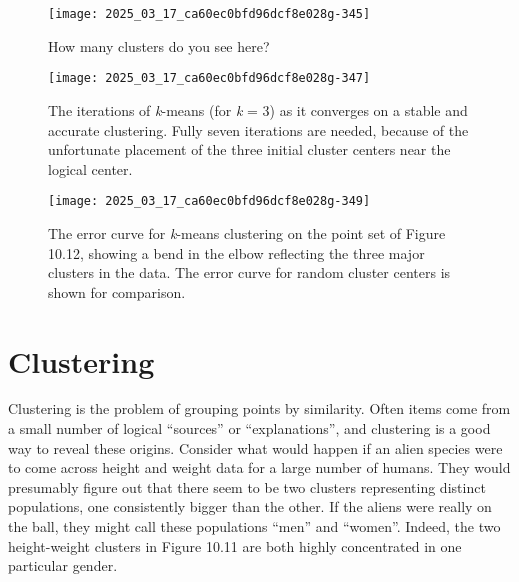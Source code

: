 \documentclass[10pt]{article}
\begin{document}
\begin{figure}[h]
\centering
\texttt{[image: 2025\_03\_17\_ca60ec0bfd96dcf8e028g-345]}
\caption{How many clusters do you see here?}
\end{figure}

\begin{figure}[h]
\centering
\texttt{[image: 2025\_03\_17\_ca60ec0bfd96dcf8e028g-347]}
\caption{The iterations of \textit{k}-means (for \textit{k} = 3) as it converges on a stable and accurate clustering. Fully seven iterations are needed, because of the unfortunate placement of the three initial cluster centers near the logical center.}
\end{figure}

\begin{figure}[h]
\centering
\texttt{[image: 2025\_03\_17\_ca60ec0bfd96dcf8e028g-349]}
\caption{The error curve for \textit{k}-means clustering on the point set of Figure 10.12, showing a bend in the elbow reflecting the three major clusters in the data. The error curve for random cluster centers is shown for comparison.}
\end{figure}

\section{Clustering}
Clustering is the problem of grouping points by similarity. Often items come from a small number of logical “sources” or “explanations”, and clustering is a good way to reveal these origins. Consider what would happen if an alien species were to come across height and weight data for a large number of humans. They would presumably figure out that there seem to be two clusters representing distinct populations, one consistently bigger than the other. If the aliens were really on the ball, they might call these populations “men” and “women”. Indeed, the two height-weight clusters in Figure 10.11 are both highly concentrated in one particular gender.
\end{document}
